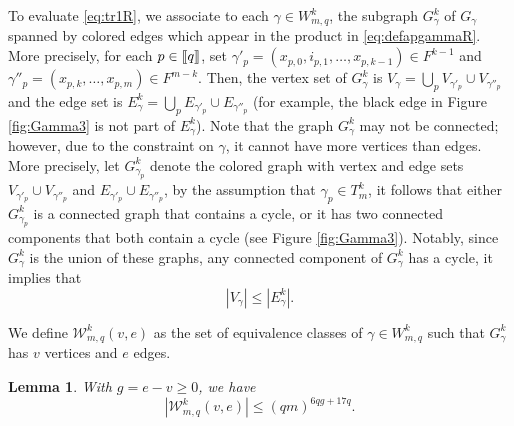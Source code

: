 \documentclass[11pt]{article}
\newtheorem{lemma}{Lemma}[section]
\newcommand{\cW}{\mathcal {W}}
\newcommand{\1}{1\!\!{\sf I}}
\newcommand{\INT}[1]{{{\left[\hspace{-1.4pt}\left[#1\right]\hspace{-1.4pt}\right]}}}
\begin{document}
To evaluate \eqref{eq:tr1R}, we associate to each $\gamma \in W^k_{m,q}$, the subgraph $G^k_\gamma$ of $G_\gamma$ spanned by colored edges which appear in the product in \eqref{eq:defapgammaR}. More precisely, for each $p \in \INT{q}$, set $\gamma'_p = (x_{p,0}, i_{p,1}, \ldots, x_{p,k-1}) \in F^{k-1}$ and 
$\gamma''_p = (x_{p,k}, \ldots, x_{p,m})\in F^{m -k}$. Then, 
the vertex set of $G^k_\gamma$  is $V_\gamma   =\bigcup_p  V_{\gamma'_p} \cup V_{\gamma''_p}$ and the edge set is 
$E^k_\gamma  =\bigcup_p   E_{\gamma'_p} \cup E_{\gamma''_p}$ (for example, the black edge in  Figure \ref{fig:Gamma3} is not part of $E^k_\gamma$).  Note that the graph $G^k_\gamma$ may not be connected; however, due to the constraint on $\gamma$, it cannot have more vertices than edges. More precisely, let 
$G^k_{\gamma_p}$ denote the colored graph with vertex and edge sets $V_{\gamma'_p} \cup V_{\gamma''_p}$ 
and $E_{\gamma'_p} \cup E_{\gamma''_p}$, by the assumption that $\gamma_p \in T^k_m$, it follows that either 
$G^k_{\gamma_p}$ is a connected graph that contains a cycle, or it has two connected components that both contain a cycle (see Figure \ref{fig:Gamma3}).  
Notably, since $G^k_{\gamma}$ is the union of these graphs, any connected component of $G^k_{\gamma}$  has a cycle, it implies that 
\begin{equation}\label{eq:vehat}
|V_\gamma | \leq |E^k_\gamma |.
\end{equation}

We define $\cW^k_{m,q}(v,e)$ as the set of equivalence classes of $\gamma \in W^k_{m,q}$ such that $G^k_\gamma$ has $v$ vertices and $e$ edges. 

\begin{lemma}\label{le:enumpathR}
With $g = e -v \geq 0$, we have  
$$
| \cW^k _{m,q} (v,e) | \leq   (q m )^{6q g   + 17 q }.
$$
\end{lemma}
\end{document}
